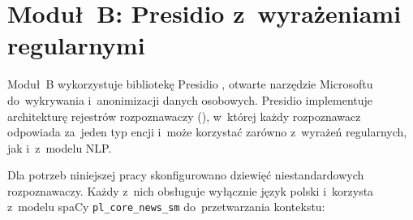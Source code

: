 \section{Moduł~B: Presidio z~wyrażeniami regularnymi}
\label{sec:modul-b}

Moduł~B wykorzystuje bibliotekę Presidio \cite{bib:presidio}, otwarte narzędzie Microsoftu do~wykrywania i~anonimizacji danych
osobowych. Presidio implementuje architekturę rejestrów rozpoznawaczy
(), w~której każdy rozpoznawacz odpowiada
za~jeden typ encji i~może korzystać zarówno z~wyrażeń regularnych,
jak i~z~modelu NLP.

Dla potrzeb niniejszej pracy skonfigurowano dziewięć niestandardowych
rozpoznawaczy. Każdy z~nich obsługuje wyłącznie język polski i~korzysta z~modelu spaCy
\texttt{pl\_core\_news\_sm} do~przetwarzania kontekstu:

